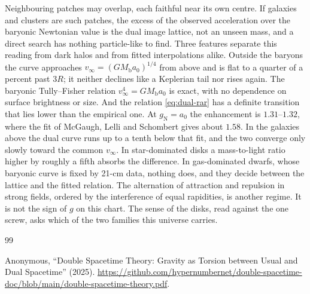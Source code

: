 \documentclass[a4paper]{article}
\begin{document}
Neighbouring patches may overlap, each faithful near its own centre. If galaxies and clusters are such patches, the excess of the observed acceleration over the baryonic Newtonian value is the dual image lattice, not an unseen mass, and a direct search has nothing particle-like to find. Three features separate this reading from dark halos and from fitted interpolations alike. Outside the baryons the curve approaches $v_\infty=(GM_{\text{b}}a_0)^{1/4}$ from above and is flat to a quarter of a percent past $3R$; it neither declines like a Keplerian tail nor rises again. The baryonic Tully--Fisher relation $v_\infty^4=GM_{\text{b}}a_0$ is exact, with no dependence on surface brightness or size. And the relation \eqref{eq:dual-rar} has a definite transition that lies lower than the empirical one. At $g_{\text{N}}=a_0$ the enhancement is $1.31$--$1.32$, where the fit of McGaugh, Lelli and Schombert gives about $1.58$. In the galaxies above the dual curve runs up to a tenth below that fit, and the two converge only slowly toward the common $v_\infty$. In star-dominated disks a mass-to-light ratio higher by roughly a fifth absorbs the difference. In gas-dominated dwarfs, whose baryonic curve is fixed by 21-cm data, nothing does, and they decide between the lattice and the fitted relation. The alternation of attraction and repulsion in strong fields, ordered by the interference of equal rapidities, is another regime. It is not the sign of $g$ on this chart. The sense of the disks, read against the one screw, asks which of the two families this universe carries.

\begin{thebibliography}{99}
\raggedright

Anonymous,
``Double Spacetime Theory: Gravity as Torsion between Usual and Dual Spacetime'' (2025).
\url{https://github.com/hypernumbernet/double-spacetime-doc/blob/main/double-spacetime-theory.pdf}.

\end{thebibliography}
\end{document}

